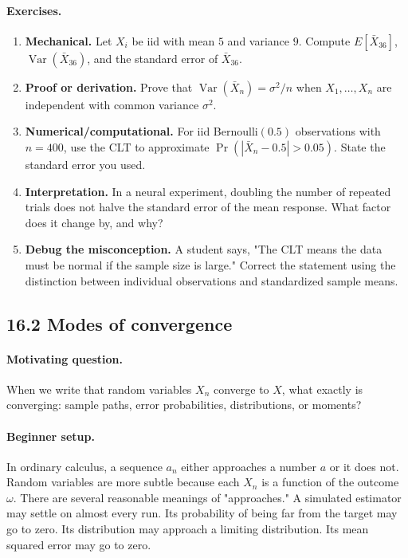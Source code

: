 \paragraph{Exercises.}
\begin{enumerate}[label=\textbf{16.1.\arabic*.}, leftmargin=*]
\item \textbf{Mechanical.} Let \(X_i\) be iid with mean \(5\) and variance \(9\). Compute \(E[\bar X_{36}]\), \(\operatorname{Var}(\bar X_{36})\), and the standard error of \(\bar X_{36}\).
\item \textbf{Proof or derivation.} Prove that \(\operatorname{Var}(\bar X_n)=\sigma^2/n\) when \(X_1,\ldots,X_n\) are independent with common variance \(\sigma^2\).
\item \textbf{Numerical/computational.} For iid Bernoulli\((0.5)\) observations with \(n=400\), use the CLT to approximate \(\Pr(|\bar X_n-0.5|>0.05)\). State the standard error you used.
\item \textbf{Interpretation.} In a neural experiment, doubling the number of repeated trials does not halve the standard error of the mean response. What factor does it change by, and why?
\item \textbf{Debug the misconception.} A student says, "The CLT means the data must be normal if the sample size is large." Correct the statement using the distinction between individual observations and standardized sample means.
\end{enumerate}

\subsection{16.2 Modes of convergence}

\paragraph{Motivating question.}
When we write that random variables \(X_n\) converge to \(X\), what exactly is converging: sample paths, error probabilities, distributions, or moments?

\paragraph{Beginner setup.}
In ordinary calculus, a sequence \(a_n\) either approaches a number \(a\) or it does not. Random variables are more subtle because each \(X_n\) is a function of the outcome \(\omega\). There are several reasonable meanings of "approaches." A simulated estimator may settle on almost every run. Its probability of being far from the target may go to zero. Its distribution may approach a limiting distribution. Its mean squared error may go to zero.

